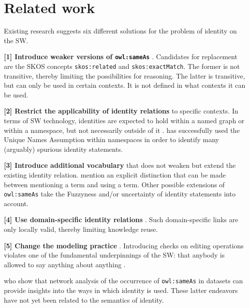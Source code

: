 \section{Related work}
\label{sec:related_work}

Existing research suggests six different solutions for
  the problem of identity on the SW.

\textbf{[1] Introduce weaker versions of {\small \texttt{owl:sameAs}}}
  \cite{HalpinHayes2010,MccuskerMcguinness2010}.
Candidates for replacement are
  the SKOS concepts
  {\small \texttt{skos:related}} and {\small \texttt{skos:exactMatch}}.
The former is not transitive,
  thereby limiting the possibilities for reasoning.
The latter is transitive,
  but can only be used in certain contexts.
It is not defined in what contexts it can be used.

\textbf{[2] Restrict the applicability of identity relations}
  to specific contexts.
In terms of SW technology, identities are expected to hold
  within a named graph or within a namespace,
  but not necessarily outside of it \cite{HalpinHayes2010}.
\cite{Melo2013} has successfully used the Unique Names Assumption
  within namespaces in order to identify many (arguably) spurious
  identity statements.

\textbf{[3] Introduce additional vocabulary} that does not weaken but extend
  the existing identity relation.
\cite{HalpinHayes2010} mention an explicit distinction that can be made
  between mentioning a term and using a term.
Other possible extensions of {\small \texttt{owl:sameAs}} take
  the Fuzzyness and/or uncertainty of identity statements into account.

\textbf{[4] Use domain-specific identity relations}
  \cite{MccuskerMcguinness2010}.
Such domain-specific links are only locally valid,
  thereby limiting knowledge reuse.

\textbf{[5] Change the modeling practice}
  \cite{HalpinHayes2010,DingShinavierFininMcguinness2010}.
Introducing checks on editing operations violates
  one of the fundamental underpinnings of the SW:
  that anybody is allowed to say anything about anything
  \cite{AntoniouGrothHarmelenHoekstra2012}.

\cite{DingShinavierShangguanMcguinness2010} who show that
  network analysis of the occurrence of {\small \texttt{owl:sameAs}}
  in datasets can provide insights into the ways in which identity is used.
These latter endeavors have not yet been related to the semantics of
  identity.

